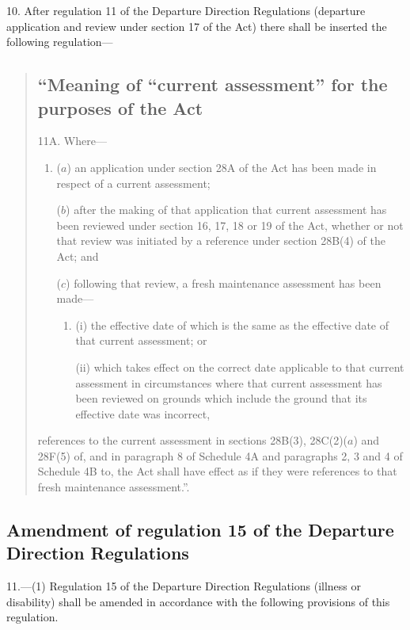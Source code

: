 \documentclass[12pt,a4paper]{article}
\begin{document}
10.  After regulation 11 of the Departure Direction Regulations (departure application and review under section 17 of the Act) there shall be inserted the following regulation—
\begin{quotation}
\subsection*{\sloppy “Meaning of “current assessment” for the purposes of the Act}

11A.  Where—
\begin{enumerate}\item[]
($a$) an application under section 28A of the Act has been made in respect of a current assessment;

($b$) after the making of that application that current assessment has been reviewed under section 16, 17, 18 or 19 of the Act, whether or not that review was initiated by a reference under section 28B(4) of the Act; and

($c$) following that review, a fresh maintenance assessment has been made—
\begin{enumerate}\item[]
(i) the effective date of which is the same as the effective date of that current assessment; or

(ii) which takes effect on the correct date applicable to that current assessment in circumstances where that current assessment has been reviewed on grounds which include the ground that its effective date was incorrect,
\end{enumerate}
\end{enumerate}
references to the current assessment in sections 28B(3), 28C(2)($a$) and 28F(5) of, and in paragraph 8 of Schedule 4A and paragraphs 2, 3 and 4 of Schedule 4B to, the Act shall have effect as if they were references to that fresh maintenance assessment.”.
\end{quotation}

\subsection[11. Amendment of regulation 15 of the Departure Direction Regulations]{Amendment of regulation 15 of the Departure Direction Regulations}

11.—(1) Regulation 15 of the Departure Direction Regulations (illness or disability) shall be amended in accordance with the following provisions of this regulation.
\end{document}

